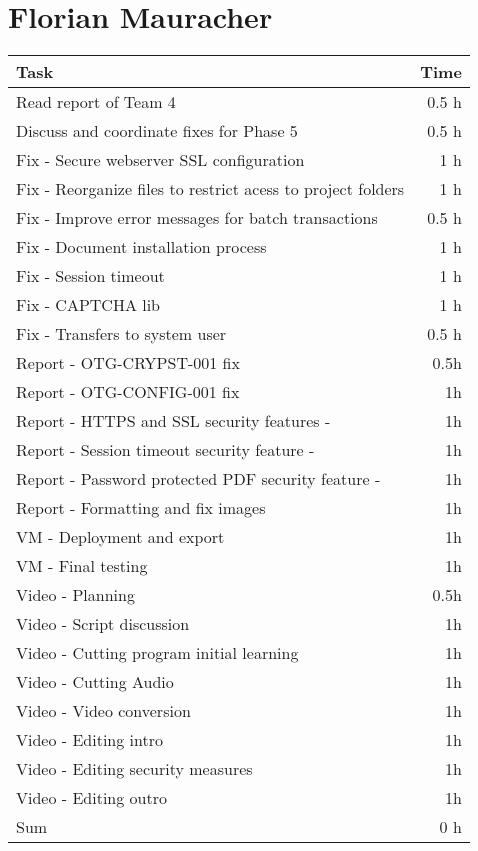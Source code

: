 \clearpage
\section*{Florian Mauracher}
\begin{table}[h!tpb]
  \centering
  \begin{tabularx}{\textwidth}{X r}
    \toprule
      Task & Time \\
    \midrule
      Read report of Team 4 & 0.5 h \\
      Discuss and coordinate fixes for Phase 5  & 0.5 h \\
      Fix - Secure webserver SSL configuration & 1 h \\
      Fix - Reorganize files to restrict acess to project folders & 1 h \\
      Fix - Improve error messages for batch transactions & 0.5 h \\
      Fix - Document installation process & 1 h \\
      Fix - Session timeout & 1 h \\
	  Fix - CAPTCHA lib & 1 h \\
      Fix - Transfers to system user & 0.5 h \\
	  Report - OTG-CRYPST-001 fix & 0.5h \\
	  Report - OTG-CONFIG-001 fix & 1h \\
	  Report - HTTPS and SSL security features - & 1h \\
	  Report - Session timeout security feature - & 1h \\
	  Report - Password protected PDF security feature - & 1h \\
	  Report - Formatting and fix images & 1h \\
	  VM - Deployment and export & 1h \\
	  VM - Final testing & 1h \\
	  Video - Planning & 0.5h \\
	  Video - Script discussion & 1h \\
	  Video - Cutting program initial learning & 1h \\
	  Video - Cutting Audio & 1h \\
	  Video - Video conversion & 1h \\
	  Video - Editing intro & 1h \\
	  Video - Editing security measures & 1h \\
	  Video - Editing outro & 1h \\
    \midrule
      Sum & 0 h \\
    \bottomrule
  \end{tabularx}
\end{table}


